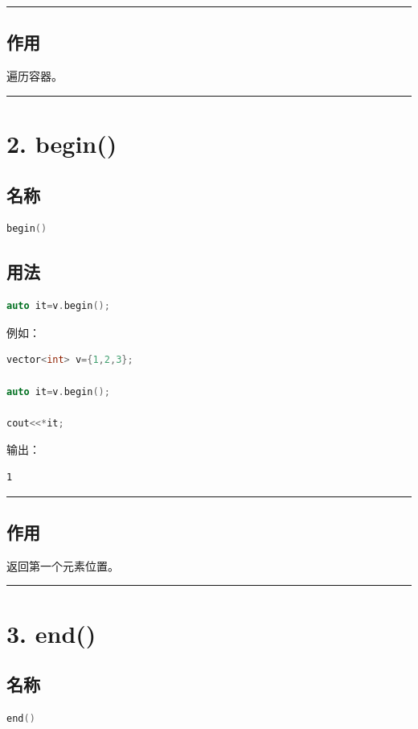 \documentclass[10pt,twocolumn]{extarticle}
\begin{document}
\noindent\rule{\linewidth}{0.4pt}

\subsection{作用}
遍历容器。

\noindent\rule{\linewidth}{0.4pt}

\section{2. begin()}

\subsection{名称}
\begin{lstlisting}[language=C++]
begin()
\end{lstlisting}

\subsection{用法}
\begin{lstlisting}[language=C++]
auto it=v.begin();
\end{lstlisting}
例如：
\begin{lstlisting}[language=C++]
vector<int> v={1,2,3};

auto it=v.begin();

cout<<*it;
\end{lstlisting}
输出：
\begin{lstlisting}
1
\end{lstlisting}

\noindent\rule{\linewidth}{0.4pt}

\subsection{作用}
返回第一个元素位置。

\noindent\rule{\linewidth}{0.4pt}

\section{3. end()}

\subsection{名称}
\begin{lstlisting}[language=C++]
end()
\end{lstlisting}
\end{document}
